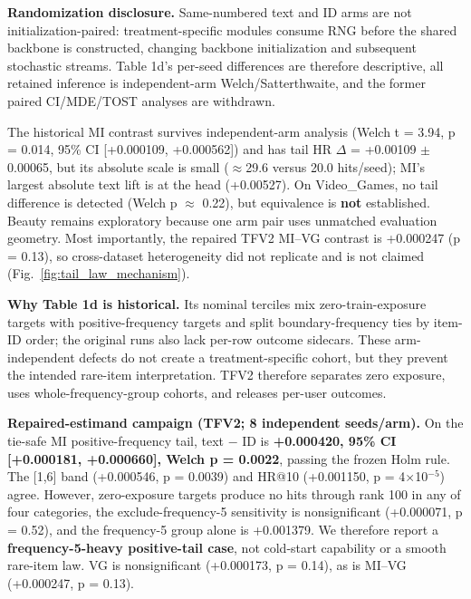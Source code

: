 \textbf{Randomization disclosure.} Same-numbered text and ID arms are not initialization-paired: treatment-specific modules consume RNG before the shared backbone is constructed, changing backbone initialization and subsequent stochastic streams. Table 1d's per-seed differences are therefore descriptive, all retained inference is independent-arm Welch/Satterthwaite, and the former paired CI/MDE/TOST analyses are withdrawn.





The historical MI contrast survives independent-arm analysis (Welch t = 3.94, p = 0.014, 95\% CI {[}+0.000109, +0.000562{]}) and has tail HR \ensuremath{\Delta} = +0.00109 \ensuremath{\pm} 0.00065, but its absolute scale is small (\ensuremath{\approx}29.6 versus 20.0 hits/seed); MI's largest absolute text lift is at the head (+0.00527). On Video\_Games, no tail difference is detected (Welch p \ensuremath{\approx} 0.22), but equivalence is \textbf{not} established. Beauty remains exploratory because one arm pair uses unmatched evaluation geometry. Most importantly, the repaired TFV2 MI--VG contrast is +0.000247 (p = 0.13), so cross-dataset heterogeneity did not replicate and is not claimed (Fig.~\ref{fig:tail_law_mechanism}).


\textbf{Why Table 1d is historical.} Its nominal terciles mix zero-train-exposure targets with positive-frequency targets and split boundary-frequency ties by item-ID order; the original runs also lack per-row outcome sidecars. These arm-independent defects do not create a treatment-specific cohort, but they prevent the intended rare-item interpretation. TFV2 therefore separates zero exposure, uses whole-frequency-group cohorts, and releases per-user outcomes.


\textbf{Repaired-estimand campaign (TFV2; 8 independent seeds/arm).} On the tie-safe MI positive-frequency tail, text \ensuremath{-} ID is \textbf{+0.000420, 95\% CI {[}+0.000181, +0.000660{]}, Welch p = 0.0022}, passing the frozen Holm rule. The {[}1,6{]} band (+0.000546, p = 0.0039) and HR@10 (+0.001150, p = 4\ensuremath{\times}10$^{-5}$) agree. However, zero-exposure targets produce no hits through rank 100 in any of four categories, the exclude-frequency-5 sensitivity is nonsignificant (+0.000071, p = 0.52), and the frequency-5 group alone is +0.001379. We therefore report a \textbf{frequency-5-heavy positive-tail case}, not cold-start capability or a smooth rare-item law. VG is nonsignificant (+0.000173, p = 0.14), as is MI--VG (+0.000247, p = 0.13).

